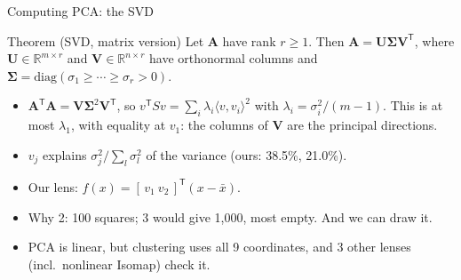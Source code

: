 \documentclass[aspectratio=169]{beamer}
\newcommand{\R}{\mathbb{R}}
\newcommand{\src}[1]{\par\vspace{2pt}\hfill{\scriptsize\textcolor{gray}{\parencite{#1}}}}
\begin{document}
\begin{frame}{Computing PCA: the SVD}
\begin{block}{Theorem (SVD, matrix version)}
Let $\mathbf A$ have rank $r \ge 1$. Then $\mathbf A = \mathbf U \boldsymbol\Sigma \mathbf V^{\mathsf T}$, where $\mathbf U \in \R^{m \times r}$ and $\mathbf V \in \R^{n \times r}$ have orthonormal columns and $\boldsymbol\Sigma = \mathrm{diag}(\sigma_1 \ge \cdots \ge \sigma_r > 0)$.
\src{axler2024ladr}
\end{block}
\begin{itemize}[<+->]
  \item $\mathbf A^{\mathsf T}\mathbf A = \mathbf V\boldsymbol\Sigma^2\mathbf V^{\mathsf T}$, so $v^{\mathsf T} S v = \sum_i \lambda_i \langle v, v_i\rangle^2$ with $\lambda_i = \sigma_i^2/(m-1)$. This is at most $\lambda_1$, with equality at $v_1$: \alert{the columns of $\mathbf V$ are the principal directions.}
  \item $v_j$ explains $\sigma_j^2 / \sum_l \sigma_l^2$ of the variance (ours: 38.5\%, 21.0\%). \hfill\parencite{jolliffecadima2016}
  \item Our lens: $f(x) = [\,v_1\ v_2\,]^{\mathsf T}(x - \bar x)$.
  \item Why 2: 100 squares; 3 would give 1{,}000, most empty. And we can draw it.
  \item PCA is \alert{linear}, but clustering uses all 9 coordinates, and 3 other lenses (incl.\ nonlinear Isomap) check it.
\end{itemize}
\end{frame}
\end{document}
